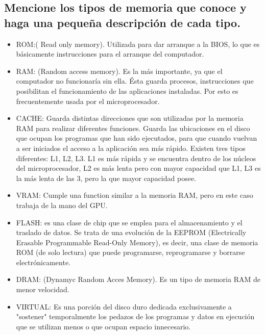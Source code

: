 \documentclass{article}
\begin{document}
\subsection{Mencione los tipos de memoria que conoce y haga una pequeña descripción de cada tipo.}
        \begin{itemize} 
        \item{}
        ROM:( Read only memory). Utilizada para dar arranque a la BIOS, lo que es básicamente instrucciones para el arranque del computador.\cite{tiposdememoria}

        \item{}RAM: (Random access memory). Es la más importante, ya que el computador no funcionaría sin ella. Ésta guarda procesos, instrucciones que posibilitan el funcionamiento de las aplicaciones instaladas. Por esto es frecuentemente usada por el microprocesador.\cite{Referencia}\cite{tiposdememoria}
        
        \item{}CACHE: Guarda distintas direcciones que son utilizadas por la memoria RAM para realizar diferentes funciones. Guarda las ubicaciones en el disco que ocupan los programas que han sido ejecutados, para que cuando vuelvan a ser iniciados el acceso a la aplicación sea más rápido. Existen tres tipos diferentes: L1, L2, L3. L1 es más rápida y se encuentra dentro de los núcleos del microprocesador, L2 es más lenta pero con mayor capacidad que L1, L3 es la más lenta de las 3, pero la que mayor capacidad posee.\cite{tiposdememoria} \cite{Referencia}
        
        \item{}VRAM: Cumple una function similar a la memoria RAM, pero en este caso trabaja de la mano del GPU.\cite{vram}
        
        \item{}FLASH: es una clase de chip que se emplea para el almacenamiento y el traslado de datos. Se trata de una evolución de la EEPROM (Electrically Erasable Programmable Read-Only Memory), es decir, una clase de memoria ROM (de solo lectura) que puede programarse, reprogramarse y borrarse electrónicamente.\cite{tiposdememoria}
        
        \item{}DRAM: (Dynamyc Random Acces Memory). Es un tipo de memoria RAM de menor velocidad.\cite{tiposdememoria}
        
        \item{}VIRTUAL: Es una porción del disco duro dedicada exclusivamente a "sostener" temporalmente los pedazos de los programas y datos en ejecución que se utilizan menos o que ocupan espacio innecesario. \cite{Referencia}
        \end{itemize}
\end{document}
